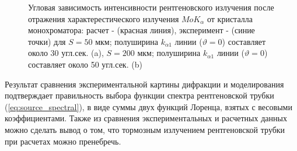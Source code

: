 \begin{figure}[H]
  \centering
  \hfill
  \caption{Угловая зависимость интенсивности рентгеновского излучения
  после отражения характерестического излучения $MoK_{\alpha}$ от кристалла монохроматора:
  расчет -  (красная линия), эксперимент - (синие точки) для $S = 50$ мкм; полуширина $k_{\alpha 1}$ линии ($\vartheta=0$)
   составляет около 30 угл.сек. (a), $S = 200$ мкм; полуширина $k_{\alpha 1}$ линии ($\vartheta=0$)
   составляет около 50 угл.сек. (b)}
  \label{ris:zero_exp}
\end{figure}

Результат сравнения экспериментальной картины дифракции и моделирования
подтверждает правильность выбора функции спектра рентгеновской трубки (\ref{eq:source_spectral}),
в виде суммы двух функций Лоренца, взятых с весовыми коэффициентами. Также из
сравнения экспериментальных и расчетных данных можно сделать вывод о том, что тормозным
излучением рентгеновской трубки при расчетах можно пренебречь.
